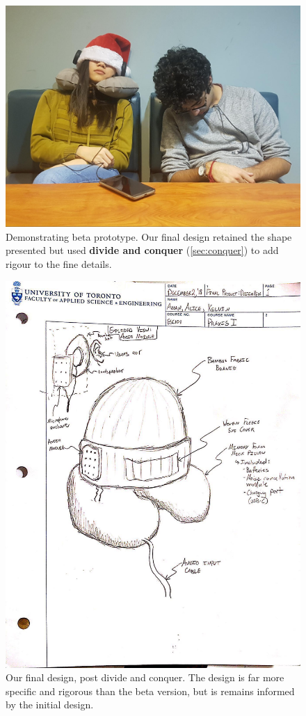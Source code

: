 \documentclass[a4paper,12pt]{article}
\begin{document}
\begin{figure}[H]
\centering
\includegraphics[width=1\textwidth]{img/image002.jpg}
\caption{Demonstrating beta prototype. Our final design retained the shape presented but used \textbf{divide and conquer} (\ref{sec:conquer}) to add rigour to the fine details.}
\label{}
\end{figure}

\begin{figure}[H]
\centering
\includegraphics[width=1\textwidth]{img/image003.jpg}
\caption{Our final design, post divide and conquer. The design is far more specific and rigorous than the beta version, but is remains informed by the initial design.}
\label{}
\end{figure}
\end{document}

